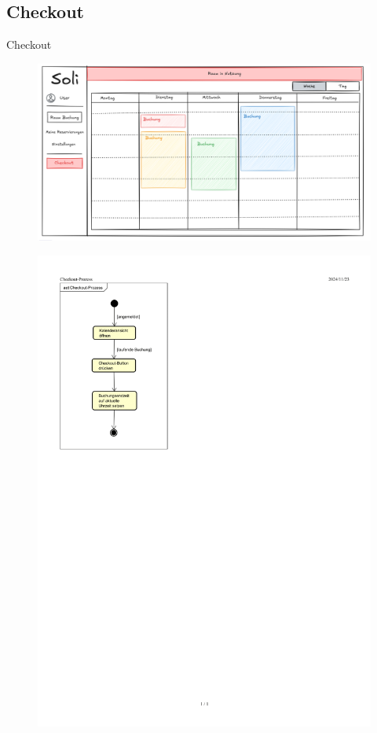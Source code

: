 \documentclass{sdqbeamer}
\begin{document}
\subsection{Checkout}
\begin{frame}{Checkout}
    \begin{figure}
        \leftfig
        \includegraphics[width=\textwidth]{pictures/figures/ui/checkout}
        \label{fig:checkout}
    \end{figure}
    \begin{figure}
        \rightfig
        \includegraphics[width=\textwidth]{pictures/figures/activity/checkoutprozess} %
        \label{fig:checkoutprozess}
    \end{figure}
\end{frame}
\end{document}
